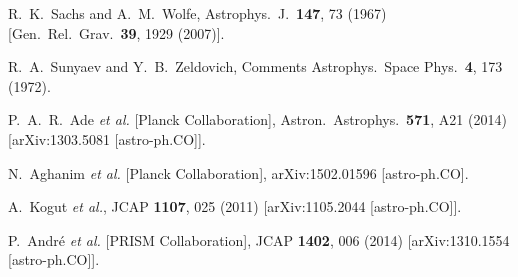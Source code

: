 \documentclass[aps,twocolumn,floats,prd,nofootinbib]{revtex4-1}
\begin{document}
\begin{thebibliography}{99}

  R.~K.~Sachs and A.~M.~Wolfe,
  Astrophys.\ J.\  {\bf 147}, 73 (1967)
  [Gen.\ Rel.\ Grav.\  {\bf 39}, 1929 (2007)].


  R.~A.~Sunyaev and Y.~B.~Zeldovich,
  Comments Astrophys.\ Space Phys.\  {\bf 4}, 173 (1972).


  P.~A.~R.~Ade {\it et al.} [Planck Collaboration],
  Astron.\ Astrophys.\  {\bf 571}, A21 (2014)
  [arXiv:1303.5081 [astro-ph.CO]].


  N.~Aghanim {\it et al.} [Planck Collaboration],
  arXiv:1502.01596 [astro-ph.CO].


  A.~Kogut {\it et al.},
  JCAP {\bf 1107}, 025 (2011)
  [arXiv:1105.2044 [astro-ph.CO]].


  P.~Andr\'e {\it et al.} [PRISM Collaboration],
  JCAP {\bf 1402}, 006 (2014)
  [arXiv:1310.1554 [astro-ph.CO]].



\end{thebibliography}
\end{document}
